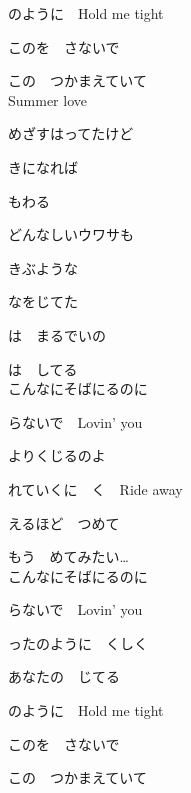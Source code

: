 {のように　Hold me tight

このを　さないで

この　つかまえていて
\\

Summer love　

めざすはってたけど

きになれば　

もわる

どんなしいウワサも　

きぶような

なをじてた

は　まるでいの

は　してる
\\

こんなにそばにるのに

らないで　Lovin' you

よりくじるのよ

れていくに　く　Ride away

えるほど　つめて

もう　めてみたい…
\\

こんなにそばにるのに

らないで　Lovin' you

ったのように　くしく

あなたの　じてる

のように　Hold me tight

このを　さないで

この　つかまえていて

}